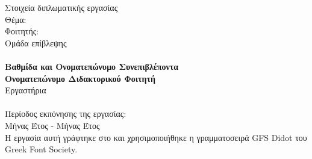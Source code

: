 \pagestyle{empty}
\begin{center}
\Large{Στοιχεία διπλωματικής εργασίας}\\[1cm]
{\large Θέμα:}
\textbf{\large \doctitle}\\[1cm]
\large {Φοιτητής: \textbf{\nomme}\\[1cm]
\large{Ομάδα επίβλεψης}\\
\textbf{\suptitle \, \supname}\\
\textbf{Βαθμίδα και Ονοματεπώνυμο Συνεπιβλέποντα}\\
\textbf{Ονοματεπώνυμο Διδακτορικού Φοιτητή}\\[1cm]
Εργαστήρια\\
\lab \\[1cm]
Περίοδος εκπόνησης της εργασίας:\\ Μήνας Έτος - Μήνας Έτος\\[1cm]
Η εργασία αυτή γράφτηκε στο \XeLaTeX{} και χρησιμοποιήθηκε η γραμματοσειρά GFS Didot του Greek Font Society.}
\end{center}